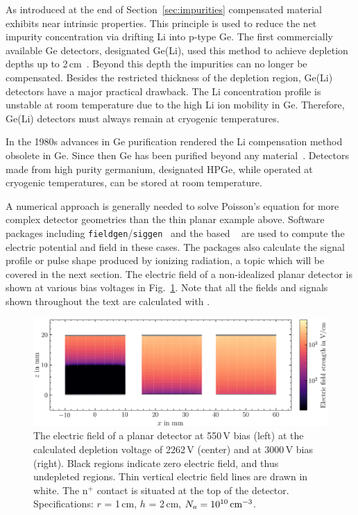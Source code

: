 As introduced at the end of Section~\ref{sec:impurities} compensated material exhibits near intrinsic properties. This principle is used to reduce the net impurity concentration via drifting Li into p-type Ge. The first commercially available Ge detectors, designated Ge(Li), used this method to achieve depletion depths up to 2\,cm~\cite{knoll}. Beyond this depth the impurities can no longer be compensated. Besides the restricted thickness of the depletion region, Ge(Li) detectors have a major practical drawback. The Li concentration profile is unstable at room temperature due to the high Li ion mobility in Ge. Therefore, Ge(Li) detectors must always remain at cryogenic temperatures.

In the 1980s advances in Ge purification rendered the Li compensation method obsolete in Ge. Since then Ge has been purified beyond any material~\cite{knoll}. Detectors made from high purity germanium, designated HPGe, while operated at cryogenic temperatures, can be stored at room temperature.

A numerical approach is generally needed to solve Poisson's equation for more complex detector geometries than the thin planar example above. Software packages including \texttt{fieldgen}/\texttt{siggen}~\cite{siggen} and the \julia{} based \SSD{}~\cite{ssd} are used to compute the electric potential and field in these cases. The packages also calculate the signal profile or pulse shape produced by ionizing radiation, a topic which will be covered in the next section. The electric field of a non-idealized planar detector is shown at various bias voltages in Fig.~\ref{fig:planar}. Note that all the fields and signals shown throughout the text are calculated with \SSD{}.
\begin{figure}[htb]
	\centering
	\includegraphics[width=6in]{figs/ge/planar_depletion_width_6_9in.png}
	\caption{The electric field of a planar detector at 550\,V bias (left) at the calculated depletion voltage of 2262\,V (center) and at 3000\,V bias (right). Black regions indicate zero electric field, and thus undepleted regions. Thin vertical electric field lines are drawn in white. The n$^+$ contact is situated at the top of the detector. Specifications: $r$ = 1\,cm, $h$ = 2\,cm, $N_a = 10^{10}\text{\,cm}^{-3}$.} 
	\label{fig:planar}
\end{figure}

